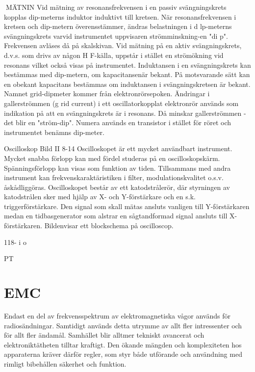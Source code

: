\documentclass[a4paper,twoside,twocolumn,openright]{book}
\begin{document}
{{{{{MÄTNIN
Vid mätning av resonansfrekvensen i en
passiv svängningskrets kopplas dip-meterns
induktor induktivt till kretsen. När resonansfrekvensen i kretsen och dip-metern överensstämmer, ändras belastningen i d lp-meterns svängningskrets varvid instrumentet
uppvisaren strömminskning-en "di p". Frekvensen avläses då på skalskivan.
Vid mätning på en aktiv svängningskrets,
d.v.s. som drivs av någon H F-källa, uppstår
i stället en strömökning vid resonans vilket
också visas på instrumentet.
Induktansen i en svängningskrets kan
bestämmas med dip-metern, om kapacitansenär bekant. På motsvarande sätt kan en
obekant kapacitans bestämmas om induktansen i svängningskretsen är bekant.
Namnet grid-dipmeter kommer från
elektronrörsepoken. Ändringar i gallerströmmen (g rid current) i ett oscillatorkopplat
elektronrör används som indikation på att en
svängningskrets är i resonans. Då minskar
gallerströmmen - det blir en "ström-dip".
Numera används en transistor i stället för
röret och instrumentet benämns dip-meter.

Oscilloskop
Bild II 8-14
Oscilloskopet är ett mycket användbart instrument. Mycket snabba förlopp kan med
fördel studeras på en oscilloskopskärm.
Spänningsförlopp kan visas som funktion av tiden. Tillsammans med andra instrument kan frekvenskaraktäristiken i filter,
modulationskvalitet o.s.v. åskådliggöras.
Oscilloskopet består av ett katodstrålerör, där styrningen av katodstrålen sker med
hjälp av X- och Y-förstärkare och en s.k.
triggerförstärkare. Den signal som skall mätas ansluts vanligen till Y-förstärkaren medan
en tidbasgenerator som alstrar en sågtandformad signal ansluts till X-förstärkaren.
Bildenvisar ett blockschema på oscilloscop.

118- i o

PT

\chapter{EMC}

Endast en del av frekvensspektrum av elektromagnetiska vågor används för radiosändningar. Samtidigt används detta utrymme av
allt fler intressenter och för allt fler ändamål.
Samhället blir alltmer tekniskt avancerat och
elektroniktätheten tilltar kraftigt. Den ökande mängden och komplexiteten hos apparaterna kräver därför regler, som styr både
utförande och användning med rimligt bibehållen säkerhet och funktion.

}}}}}
\end{document}
